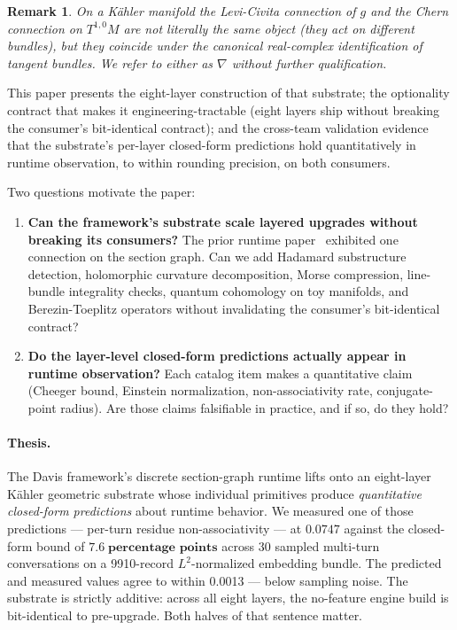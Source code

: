 \documentclass[11pt,letterpaper]{article}
\newtheorem{remark}[theorem]{Remark}
\begin{document}
\begin{remark}
On a K\"ahler manifold the Levi-Civita connection of $g$ and the
Chern connection on $T^{1,0} M$ are not literally the same object
(they act on different bundles), but they coincide under the
canonical real-complex identification of tangent bundles. We refer
to either as $\nabla$ without further qualification.
\end{remark}

This paper presents the eight-layer construction of that substrate;
the optionality contract that makes it engineering-tractable (eight
layers ship without breaking the consumer's bit-identical contract);
and the cross-team validation evidence that the substrate's per-layer
closed-form predictions hold quantitatively in runtime observation,
to within rounding precision, on both consumers.

Two questions motivate the paper:

\begin{enumerate}[nosep]
\item \textbf{Can the framework's substrate scale layered upgrades
  without breaking its consumers?} The prior runtime
  paper~\cite{davis2026sheafcomposition} exhibited one connection on
  the section graph. Can we add Hadamard substructure detection,
  holomorphic curvature decomposition, Morse compression,
  line-bundle integrality checks, quantum cohomology on toy
  manifolds, and Berezin-Toeplitz operators without invalidating the
  consumer's bit-identical contract?
\item \textbf{Do the layer-level closed-form predictions actually
  appear in runtime observation?} Each catalog item makes a
  quantitative claim (Cheeger bound, Einstein normalization,
  non-associativity rate, conjugate-point radius). Are those claims
  falsifiable in practice, and if so, do they hold?
\end{enumerate}

\paragraph{Thesis.} The Davis framework's discrete section-graph
runtime lifts onto an eight-layer K\"ahler geometric substrate whose
individual primitives produce \emph{quantitative closed-form
predictions} about runtime behavior. We measured one of those
predictions --- per-turn residue non-associativity --- at
$\mathbf{0.0747}$ against the closed-form bound of
$\mathbf{7.6\;\text{percentage points}}$ across 30 sampled multi-turn
conversations on a 9910-record $L^2$-normalized embedding bundle.
The predicted and measured values agree to within 0.0013 --- below
sampling noise. The substrate is strictly additive: across all eight
layers, the no-feature engine build is bit-identical to pre-upgrade.
Both halves of that sentence matter.
\end{document}
